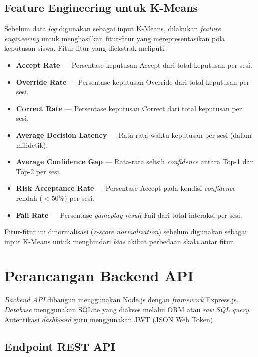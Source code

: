 \documentclass[10pt,twoside,openright]{report}
\begin{document}
\subsection{Feature Engineering untuk K-Means}

Sebelum data \textit{log} digunakan sebagai input K-Means, dilakukan \textit{feature engineering} untuk menghasilkan fitur-fitur yang merepresentasikan pola keputusan siswa. Fitur-fitur yang diekstrak meliputi:

\begin{itemize}
    \item \textbf{Accept Rate} --- Persentase keputusan Accept dari total keputusan per sesi.
    \item \textbf{Override Rate} --- Persentase keputusan Override dari total keputusan per sesi.
    \item \textbf{Correct Rate} --- Persentase keputusan Correct dari total keputusan per sesi.
    \item \textbf{Average Decision Latency} --- Rata-rata waktu keputusan per sesi (dalam milidetik).
    \item \textbf{Average Confidence Gap} --- Rata-rata selisih \textit{confidence} antara Top-1 dan Top-2 per sesi.
    \item \textbf{Risk Acceptance Rate} --- Persentase Accept pada kondisi \textit{confidence} rendah ($<50\%$) per sesi.
    \item \textbf{Fail Rate} --- Persentase \textit{gameplay result} Fail dari total interaksi per sesi.
\end{itemize}

Fitur-fitur ini dinormalisasi (\textit{z-score normalization}) sebelum digunakan sebagai input K-Means untuk menghindari \textit{bias} akibat perbedaan skala antar fitur.

\section{Perancangan Backend API}
\label{sec:perancangan-backend-api}

\textit{Backend API} dibangun menggunakan Node.js dengan \textit{framework} Express.js. \textit{Database} menggunakan SQLite yang diakses melalui ORM atau \textit{raw SQL query}. Autentikasi \textit{dashboard} guru menggunakan JWT (JSON Web Token).

\subsection{Endpoint REST API}
\end{document}
